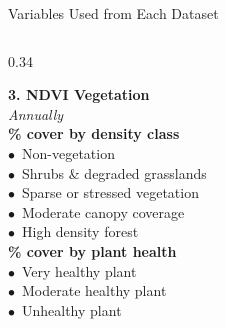 \documentclass{beamer}
\begin{document}
\begin{frame}{Variables Used from Each Dataset}
\begin{columns}[T]
			\begin{column}{0.34\textwidth}
				\begin{tcolorbox}[colback=lightemerald1, colframe=emerald1, boxrule=0.9pt,
					arc=2pt, left=3pt, right=3pt, top=3pt, bottom=3pt]
					{\scriptsize\textbf{\color{emerald1}3. NDVI Vegetation}}\\[1pt]
					{\tiny\textit{Annually}}\\[4pt]
					{\tiny
						\textbf{\% cover by density class}\\[2pt]
						$\bullet$~Non-vegetation\\[1pt]
						$\bullet$~Shrubs \& degraded grasslands\\[1pt]
						$\bullet$~Sparse or stressed vegetation\\[1pt]
						$\bullet$~Moderate canopy coverage\\[1pt]
						$\bullet$~High density forest\\[5pt]
						\textbf{\% cover by plant health}\\[2pt]
						$\bullet$~Very healthy plant\\[1pt]
						$\bullet$~Moderate healthy plant\\[1pt]
						$\bullet$~Unhealthy plant}
				\end{tcolorbox}
			\end{column}
			
		\end{columns}
	\end{frame}
	
\end{document}

